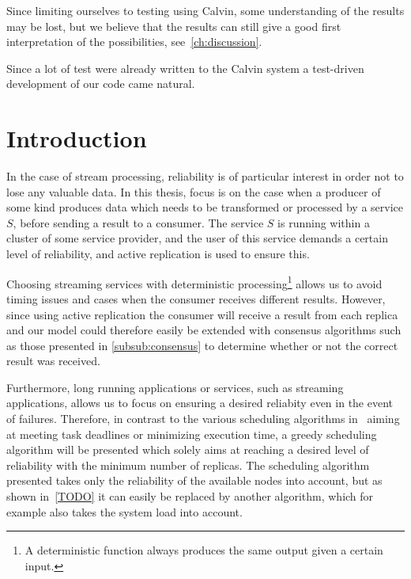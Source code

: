 \documentclass{cslthse-msc}
\begin{document}
Since limiting ourselves to testing using Calvin, some understanding of the results may be lost, but we believe that the results can still give a good first interpretation of the possibilities, see~\cref{ch:discussion}. 

Since a lot of test were already written to the Calvin system a test-driven development of our code came natural.

\section{Introduction} \label{sec:design_intro}
In the case of stream processing, reliability is of particular interest in order not to lose any valuable data. In this thesis, focus is on the case when a producer of some kind produces data which needs to be transformed or processed by a service $S$, before sending a result to a consumer. The service $S$ is running within a cluster of some service provider, and the user of this service demands a certain level of reliability, and active replication is used to ensure this.	

Choosing streaming services with deterministic processing\footnote{A deterministic function always produces the same output given a certain input.} allows us to avoid timing issues and cases when the consumer receives different results. However, since using active replication the consumer will receive a result from each replica and our model could therefore easily be extended with consensus algorithms such as those presented in \cref{subsub:consensus} to determine whether or not the correct result was received. 

Furthermore, long running applications or services, such as streaming applications, allows us to focus on ensuring a desired reliabity even in the event of failures. Therefore, in contrast to the various scheduling algorithms in~\cite{algoOptTimeMaxRel, optTaskAllocationForMaxRel, taskAllocation, taskAllocationSwarm, algoMaxRelEndToEndConstraint, algoMinExTime, schedReplicas} aiming at meeting task deadlines or minimizing execution time, a greedy scheduling algorithm will be presented which solely aims at reaching a desired level of reliability with the minimum number of replicas. The scheduling algorithm presented takes only the reliability of the available nodes into account, but as shown in~\ref{TODO} it can easily be replaced by another algorithm, which for example also takes the system load into account.
\end{document}
